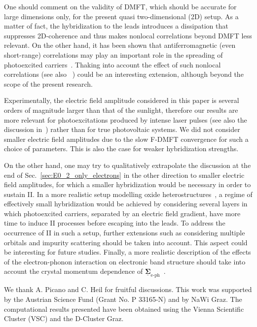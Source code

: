 \documentclass[aps,prb,groupedaddress,showpacs,twocolumn,superscriptaddress,10pt]{revtex4-2}
\newcommand{\mat}[1]{\bm{#1}} %
\newcommand{\kel}[1]{\underline{#1}} %
\newcommand{\resub}[1]{{\color{hblue} #1}}
\begin{document}
\resub{One should comment on the validity of DMFT, which should be accurate for large dimensions only, for the present quasi two-dimensional (2D) setup. As a matter of fact, the hybridization to the leads introduces a dissipation that suppresses 2D-coherence and thus makes nonlocal correlations beyond DMFT less relevant.
On the other hand, it has been shown that antiferromagnetic (even short-range) correlations may play an important role in the spreading of photoexcited carriers~\cite{ec.we.14}. 
Thaking into account the effect of such nonlocal correlations (see also ~\cite{ro.ha.18}) could be an interesting extension, although beyond the scope of the present research.}

Experimentally, the electric field amplitude considered in this paper is several orders of magnitude larger than that of the sunlight, therefore our results are more relevant for photoexcitations produced by intense laser pulses (see also the discussion in~\cite{mu.we.18}) rather than for true photovoltaic systems. \resub{We did not consider smaller electric field amplitudes due to the slow F-DMFT convergence for such a choice of parameters. This is also the case for weaker hybridization strengths.} 
 
On the other hand, one may try to qualitatively extrapolate the discussion at the end of Sec.~\ref{sec:E0_2_only_electrons} in the other direction to smaller electric field amplitudes, for which a smaller hybridization would be necessary in order to sustain II. In a more realistic setup modelling oxide heterostructures~\cite{as.bl.13,pe.be.19}, a regime of effectively small hybridization would be achieved by considering several layers in which photoexcited carriers, separated by an electric field gradient, have more time to induce II processes before escaping into the leads. To address the occurrence of II in such a setup, further extensions such as considering multiple orbitals and impurity scattering should be taken into account. This aspect could be interesting for future studies.    
 \resub{Finally, a more realistic description of the effects of the electron-phonon interaction on electronic band structure should take into account the crystal momentum dependence of $\kel{\mat{\Sigma}}_{\text{e-ph}}$~\cite{gius.17}.} 

   
\acknowledgments  

We thank A. Picano and C. Heil for fruitful discussions. This work was supported by the Austrian Science Fund (Grant No. P 33165-N) and by NaWi Graz. The computational results presented have been obtained using the Vienna Scientific Cluster (VSC) and the D-Cluster Graz.
 
    
 
 
\end{document}
